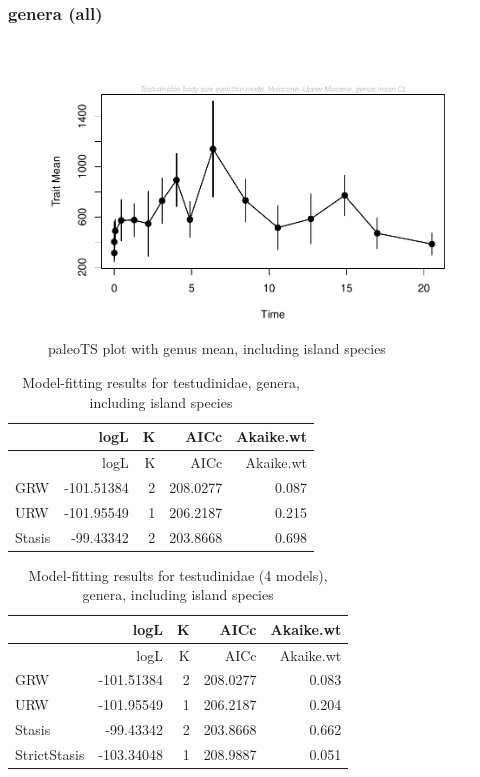 \documentclass[]{article}
\begin{document}
\newpage

\subsubsection{genera (all)}\label{genera-all}

\begin{figure}[htbp]
\centering
\includegraphics{MA_JJ_files/figure-latex/paleoTS plot with genus mean, including island species-1.pdf}
\caption{paleoTS plot with genus mean, including island species}
\end{figure}

\begin{longtable}[]{@{}lrrrr@{}}
\caption{Model-fitting results for testudinidae, genera, including
island species}\tabularnewline
\toprule
& logL & K & AICc & Akaike.wt\tabularnewline
\midrule
\endfirsthead
\toprule
& logL & K & AICc & Akaike.wt\tabularnewline
\midrule
\endhead
GRW & -101.51384 & 2 & 208.0277 & 0.087\tabularnewline
URW & -101.95549 & 1 & 206.2187 & 0.215\tabularnewline
Stasis & -99.43342 & 2 & 203.8668 & 0.698\tabularnewline
\bottomrule
\end{longtable}

\begin{longtable}[]{@{}lrrrr@{}}
\caption{Model-fitting results for testudinidae (4 models), genera,
including island species}\tabularnewline
\toprule
& logL & K & AICc & Akaike.wt\tabularnewline
\midrule
\endfirsthead
\toprule
& logL & K & AICc & Akaike.wt\tabularnewline
\midrule
\endhead
GRW & -101.51384 & 2 & 208.0277 & 0.083\tabularnewline
URW & -101.95549 & 1 & 206.2187 & 0.204\tabularnewline
Stasis & -99.43342 & 2 & 203.8668 & 0.662\tabularnewline
StrictStasis & -103.34048 & 1 & 208.9887 & 0.051\tabularnewline
\bottomrule
\end{longtable}
\end{document}
